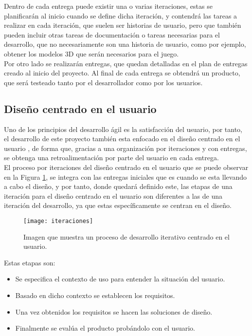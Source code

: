 Dentro de cada entrega puede existir una o varias iteraciones, estas se planificarán al inicio cuando se define dicha iteración, y contendrá las tareas a realizar en cada iteración, que suelen ser historias de usuario, pero que también pueden incluir otras tareas de documentación o tareas necesarias para el desarrollo, que no necesariamente son una historia de usuario, como por ejemplo, obtener los modelos 3D que serán necesarios para el juego.\\

Por otro lado se realizarán entregas, que quedan detalladas en el plan de entregas creado al inicio del proyecto. Al final de cada entrega se obtendrá un producto, que será testeado tanto por el desarrollador como por los usuarios.

\subsection{Diseño centrado en el usuario}
Uno de los principios del desarrollo ágil es la satisfacción del usuario, por tanto, el desarrollo de este proyecto también esta enfocado en el diseño centrado en el usuario \cite{sanchez}, de forma que, gracias a una organización por iteraciones y con entregas, se obtenga una retroalimentación por parte del usuario en cada entrega.\\

El proceso por iteraciones del diseño centrado en el usuario que se puede observar en la Figura \ref{figura-iteraciones}, se integra con las entregas iniciales que es cuando se esta llevando a cabo el diseño, y por tanto, donde quedará definido este, las etapas de una iteración para el diseño centrado en el usuario son diferentes a las de una iteración del desarrollo, ya que estas específicamente se centran en el diseño.

\begin{figure}[h]
  \centering
  \texttt{[image: iteraciones]}
  \caption{Imagen que muestra un proceso de desarrollo iterativo centrado en el usuario.\protect\footnotemark}
  \label{figura-iteraciones}
\end{figure}


\newpage

Estas etapas son:
\begin{itemize}
  \item Se especifica el contexto de uso para entender la situación del usuario.
  \item Basado en dicho contexto se establecen los requisitos.
  \item Una vez obtenidos los requisitos se hacen las soluciones de diseño.
  \item Finalmente se evalúa el producto probándolo con el usuario.
\end{itemize}

